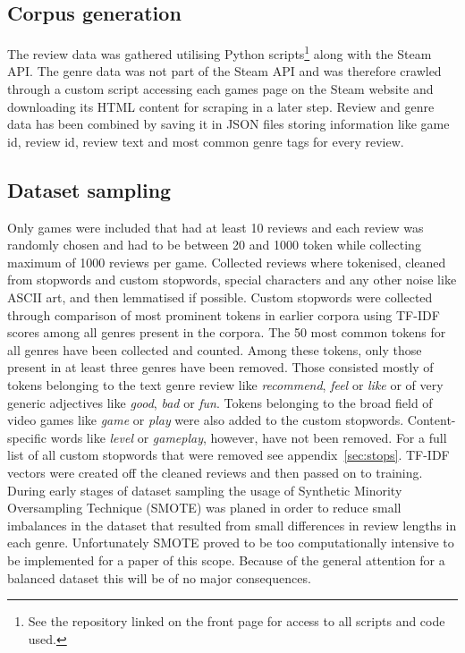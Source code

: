 \documentclass[11pt, a4paper]{article}
\begin{document}

\subsection{Corpus generation}\label{subsec:corpus-generation}
The review data was gathered utilising Python scripts\footnote{See the repository linked on the front page for access
to all scripts and code used.} along with the Steam API. The genre data
was not part of the Steam API and was therefore crawled through a custom script accessing each games page on the Steam
website and downloading its HTML content for scraping in a later step.
Review and genre data has been combined by saving it in JSON files storing information like game id, review id,
review text and most common genre tags for every review.

\subsection{Dataset sampling}
Only games were included that had at least 10 reviews and each review was randomly chosen and had to be between 20 and
1000 token while collecting maximum of 1000 reviews per game.
Collected reviews where tokenised, cleaned from stopwords and custom stopwords, special characters and any other
noise like ASCII art, and then lemmatised if possible.
Custom stopwords were collected through comparison of most prominent tokens in earlier corpora using TF-IDF scores
among all genres present in the corpora.
The 50 most common tokens for all genres have been collected and counted.
Among these tokens, only those present in at least three genres have been removed.
Those consisted mostly of tokens belonging to the text genre review like \textit{recommend}, \textit{feel} or
\textit{like} or of very generic adjectives like \textit{good}, \textit{bad} or \textit{fun}.
Tokens belonging to the broad field of video games like \textit{game} or \textit{play} were also added to the custom
stopwords.
Content-specific words like \textit{level} or \textit{gameplay}, however, have not been removed.
For a full list of all custom stopwords that were removed see appendix~\ref{sec:stops}.
TF-IDF vectors were created off the cleaned reviews and then passed on to training.
During early stages of dataset sampling the usage of Synthetic Minority Oversampling Technique (SMOTE) was
planed in order to reduce small imbalances in the dataset that resulted from small differences in review lengths in
each genre.
Unfortunately SMOTE proved to be too computationally intensive to be implemented for a paper of this scope.
Because of the general attention for a balanced dataset this will be of no major consequences.
\end{document}
